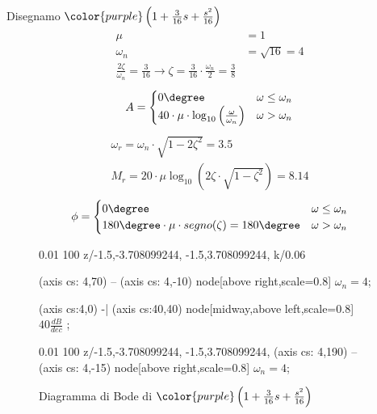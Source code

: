 \documentclass[a4paper]{article}
\begin{document}
\begin{example}
    \vspace{1em}
    \noindent
    Disegnamo \( \color{purple} \left( 1 + \frac{3}{16}s + \frac{s ^2}{16} \right)  \) 
    \[
    \begin{aligned}
      \mu &= 1\\
      \omega_n &= \sqrt{16} = 4\\
      \frac{2 \zeta}{\omega_n} = \frac{3}{16} \to \zeta = \frac{3}{16} \cdot \frac{\omega_n}{2} = \frac{3}{8}
    \end{aligned}
    \] 
    \[
    \begin{aligned}
      A &= \begin{cases}
        0\degree & \omega \le \omega_n\\
        40 \cdot \mu \cdot \log_{10} \left( \frac{\omega}{\omega_n} \right) & \omega > \omega_n
      \end{cases}\\
    \end{aligned}
    \] 
    \[
      \begin{aligned}
        \omega_r = \omega_n \cdot \sqrt{1 - 2 \zeta^2} = 3.5\\
        M_r = 20 \cdot \mu \log_{10} \left( 2 \zeta \cdot \sqrt{1 - \zeta^2} \right) = 8.14
      \end{aligned}
    \] 
    \[
    \phi = \begin{cases}
      0\degree & \omega \le \omega_n\\
      180\degree \cdot \mu \cdot segno(\zeta) = 180\degree & \omega > \omega_n
    \end{cases}
    \] 
    \begin{figure}[H]
      \centering
      \begin{BodeMagPlot}[scale=1.5,ytick distance=20,ylabel={Ampiezza (dB)},xlabel={}] {0.01} {100}
        {
          z/{{-1.5,-3.708099244}, {-1.5,3.708099244}},
          k/0.06
        }

         (axis cs: 4,70) -- (axis cs: 4,-10) node[above right,scale=0.8] {\( \omega_n = 4 \)};

         (axis cs:4,0) -| (axis cs:40,40) 
        node[midway,above left,scale=0.8] {\( 40 \frac{dB}{dec} \) };
      \end{BodeMagPlot}

      \begin{BodePhPlot}[
        scale=1.5,ytick distance=90,ylabel={Fase (deg)},xlabel={Frequenza (rad/s)},
        ] {0.01} {100}
        {
          z/{{-1.5,-3.708099244}, {-1.5,3.708099244}},
        }
         (axis cs: 4,190) -- (axis cs: 4,-15) node[above right,scale=0.8] {\( \omega_n = 4 \)};
      \end{BodePhPlot}
      \caption{Diagramma di Bode di 
      \( \color{purple} \left( 1 + \frac{3}{16}s + \frac{s ^2}{16} \right)  \)}
    \end{figure}


\end{example}
\end{document}
